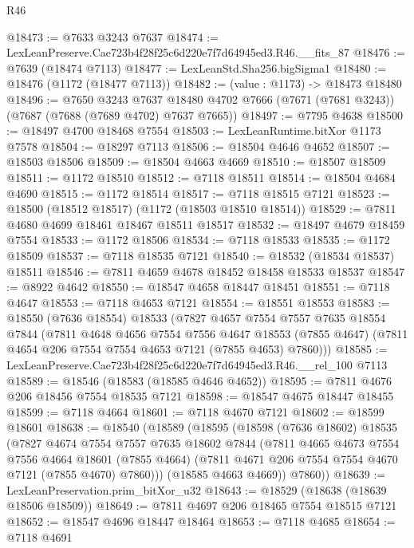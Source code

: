 \begin{lexlean}{R46}
\begin{coremodule}
@18473 := @7633 @3243 @7637
@18474 := LexLeanPreserve.Cae723b4f28f25c6d220e7f7d64945ed3.R46.__fits_87
@18476 := @7639 (@18474 @7113)
@18477 := LexLeanStd.Sha256.bigSigma1
@18480 := @18476 (@1172 (@18477 @7113))
@18482 := (value : @1173) -> @18473 @18480
@18496 := @7650
    @3243
    @7637
    @18480
    @4702
    @7666
    (@7671 (@7681 @3243))
    (@7687 (@7688 (@7689 @4702) @7637 @7665))
@18497 := @7795 @4638
@18500 := @18497 @4700 @18468 @7554
@18503 := LexLeanRuntime.bitXor @1173 @7578
@18504 := @18297 @7113
@18506 := @18504 @4646 @4652
@18507 := @18503 @18506
@18509 := @18504 @4663 @4669
@18510 := @18507 @18509
@18511 := @1172 @18510
@18512 := @7118 @18511
@18514 := @18504 @4684 @4690
@18515 := @1172 @18514
@18517 := @7118 @18515 @7121
@18523 := @18500 (@18512 @18517) (@1172 (@18503 @18510 @18514))
@18529 := @7811 @4680 @4699 @18461 @18467 @18511 @18517
@18532 := @18497 @4679 @18459 @7554
@18533 := @1172 @18506
@18534 := @7118 @18533
@18535 := @1172 @18509
@18537 := @7118 @18535 @7121
@18540 := @18532 (@18534 @18537) @18511
@18546 := @7811 @4659 @4678 @18452 @18458 @18533 @18537
@18547 := @8922 @4642
@18550 := @18547 @4658 @18447 @18451
@18551 := @7118 @4647
@18553 := @7118 @4653 @7121
@18554 := @18551 @18553
@18583 := @18550
    (@7636 @18554)
    @18533
    (@7827
      @4657
      @7554
      @7557
      @7635
      @18554
      @7844
      (@7811
        @4648
        @4656
        @7554
        @7556
        @4647
        @18553
        (@7855 @4647)
        (@7811 @4654 @206 @7554 @7554 @4653 @7121 (@7855 @4653) @7860)))
@18585 := LexLeanPreserve.Cae723b4f28f25c6d220e7f7d64945ed3.R46.__rel_100 @7113
@18589 := @18546 (@18583 (@18585 @4646 @4652))
@18595 := @7811 @4676 @206 @18456 @7554 @18535 @7121
@18598 := @18547 @4675 @18447 @18455
@18599 := @7118 @4664
@18601 := @7118 @4670 @7121
@18602 := @18599 @18601
@18638 := @18540
    (@18589
      (@18595
        (@18598
          (@7636 @18602)
          @18535
          (@7827
            @4674
            @7554
            @7557
            @7635
            @18602
            @7844
            (@7811
              @4665
              @4673
              @7554
              @7556
              @4664
              @18601
              (@7855 @4664)
              (@7811 @4671 @206 @7554 @7554 @4670 @7121 (@7855 @4670) @7860)))
          (@18585 @4663 @4669))
        @7860))
@18639 := LexLeanPreservation.prim_bitXor_u32
@18643 := @18529 (@18638 (@18639 @18506 @18509))
@18649 := @7811 @4697 @206 @18465 @7554 @18515 @7121
@18652 := @18547 @4696 @18447 @18464
@18653 := @7118 @4685
@18654 := @7118 @4691

\end{coremodule}
\end{lexlean}
